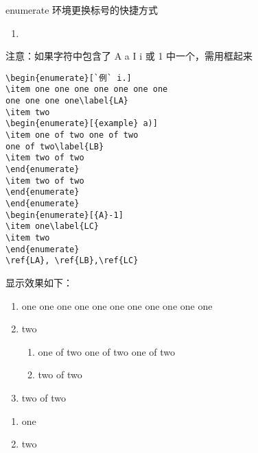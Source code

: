 enumerate 环境更换标号的快捷方式

\begin{cmd}[label=enuemerate 更换标号]
  \begin{enumerate}[A a I i 或 1 + 任意字符]
  \item
  \end{enumerate}
  注意：如果字符中包含了 A a I i 或 1 中一个，需用{}框起来
\end{cmd}

\begin{lstlisting}[language={[LaTeX]TeX}]
\begin{enumerate}[`例` i.]
\item one one one one one one one
one one one one\label{LA}
\item two
\begin{enumerate}[{example} a)]
\item one of two one of two
one of two\label{LB}
\item two of two
\end{enumerate}
\item two of two
\end{enumerate}
\end{enumerate}
\begin{enumerate}[{A}-1]
\item one\label{LC}
\item two
\end{enumerate}
\ref{LA}, \ref{LB},\ref{LC}
\end{lstlisting}

显示效果如下：

\begin{enumerate}[例 i.]
\item one one one one one one one
one one one one \label{LA}
\item two

\begin{enumerate}[{example} a)]
\item one of two one of two
one of two \label{LB}
\item two of two
\end{enumerate}

\item two of two
\end{enumerate}

\begin{enumerate}[{A}-1]
\item one \label{LC}
\item two
\end{enumerate}

